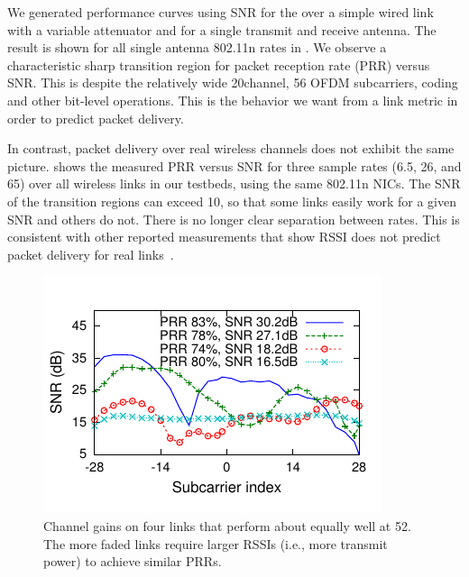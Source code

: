We generated performance curves using SNR for the  over a simple wired link with a variable attenuator and for a single transmit and receive antenna. The result is shown for all single antenna 802.11n rates in . 
We observe a characteristic sharp transition region for packet reception rate (PRR) versus SNR\@. This is despite the relatively wide 20\MHz channel, 56 OFDM subcarriers, coding and other bit-level operations. This is the behavior we want from a link metric in order to predict packet delivery.

In contrast, packet delivery over real wireless channels does not exhibit the same picture.  shows the measured PRR versus SNR for three sample rates (6.5, 26, and 65\Mbps) over all wireless links in our testbeds, using the same 802.11n NICs. The SNR of the transition regions can exceed 10\dB, so that some links easily work for a given SNR and others do not. There is no longer clear separation between rates. This is consistent with other reported measurements that show RSSI does not predict packet delivery for real links~\cite{aguayo_roofnet, reis_sigcomm06, snr_infocom08, zhao_sensys03}.

\begin{figure}[t]
  \centering
  \includegraphics[width=\columnwidth,viewport=2 9 185 108,clip]{figures/embed_fsf-shape-two-links.pdf}
  \caption{Channel gains on four links that perform about equally well at 52\Mbps. The more faded links require larger RSSIs (i.e., more transmit power) to achieve similar PRRs.}
  \label{fig:example_fsf_shape}

\end{figure}

